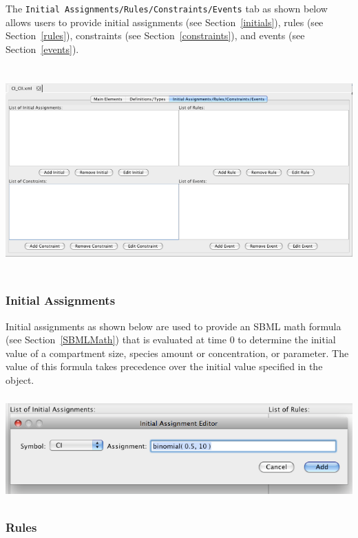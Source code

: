 \documentclass[titlepage,11pt]{article}
\begin{document}
\noindent
The {\tt Initial Assignments/Rules/Constraints/Events} 
tab as shown below allows users to provide initial assignments 
(see Section~\ref{initials}), 
rules (see Section~\ref{rules}), 
constraints (see Section~\ref{constraints}), and
events (see Section~\ref{events}).
\begin{center}
\includegraphics[height=80mm]{screenshots/IRCE}
\end{center}

\subsubsection{\label{initials}Initial Assignments}

\noindent
Initial assignments as shown below are used to provide an SBML math formula 
(see Section~\ref{SBMLMath}) that is evaluated at time 0 to determine 
the initial value of a compartment size, species amount or
concentration, or parameter.  The value of this formula takes precedence over
the initial value specified in the object.  
\begin{center}
\includegraphics[height=40mm]{screenshots/initial}
\end{center}

\clearpage

\subsubsection{\label{rules}Rules}
\end{document}
